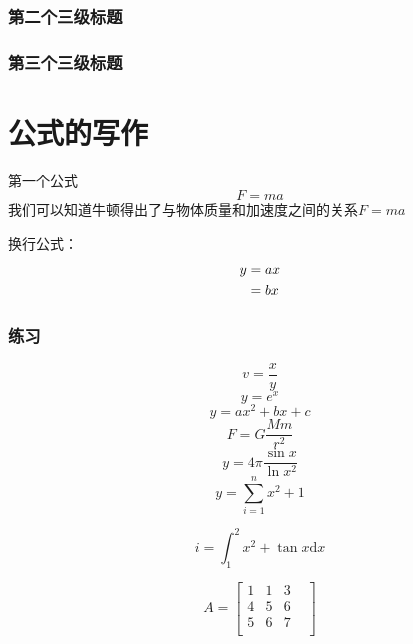 \documentclass[UTF8]{ctexart}
\begin{document}
\subsubsection{第二个三级标题}


\subsubsection{第三个三级标题}

\section{公式的写作}
第一个公式
\begin{equation}
	F=ma
\end{equation}
我们可以知道牛顿得出了与物体质量和加速度之间的关系$F=ma$

换行公式：
\begin{align}
	y & =ax\notag \\
	  & =bx
\end{align}

\subsubsection{练习}
\begin{equation}
	v=\frac{x}{y}
\end{equation}
\begin{equation}
	y=e^{x}
\end{equation}
\begin{equation}
	y=ax^2+bx+c
\end{equation}
\begin{equation}
	F=G\frac{Mm}{r^2}
\end{equation}
\begin{equation}
	y=4\pi \frac{\sin{x}}{\ln{x^2}}
\end{equation}
\begin{equation}
	\label{eq:ceshi}
	y=\sum^{n}_{i=1} x^2+1
\end{equation}


\begin{equation}
	i=\int_{1}^{2}x^2+\tan{x}\mathrm{d}x
\end{equation}

\begin{equation}
	A=\begin{bmatrix}
		1 & 1 & 3 \\4&5&6\\5&6&7&\\
	\end{bmatrix}
\end{equation}
\end{document}
